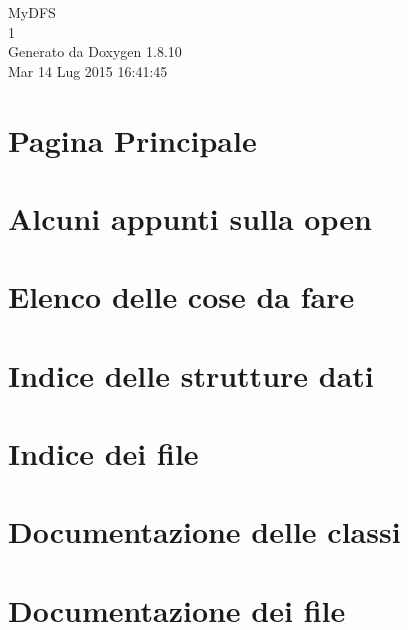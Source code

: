 \documentclass[twoside]{book}
\newcommand{\+}{\discretionary{\mbox{\scriptsize$\hookleftarrow$}}{}{}}
\newcommand{\clearemptydoublepage}{%
  \newpage{\pagestyle{empty}\cleardoublepage}%
}
\begin{document}
\hypersetup{pageanchor=false,
             bookmarks=true,
             bookmarksnumbered=true,
             pdfencoding=unicode
            }
\begin{titlepage}
\vspace*{7cm}
\begin{center}%
{\Large My\+D\+F\+S \\[1ex]\large 1 }\\
\vspace*{1cm}
{\large Generato da Doxygen 1.8.10}\\
\vspace*{0.5cm}
{\small Mar 14 Lug 2015 16:41:45}\\
\end{center}
\end{titlepage}
\clearemptydoublepage
\tableofcontents
\clearemptydoublepage
{}
\hypersetup{pageanchor=true}

\chapter{Pagina Principale}
\label{index}\hypertarget{index}{}
\chapter{Alcuni appunti sulla open}
\label{md_OPE}
\hypertarget{md_OPE}{}

\chapter{Elenco delle cose da fare}
\label{todo}
\hypertarget{todo}{}

\chapter{Indice delle strutture dati}

\chapter{Indice dei file}

\chapter{Documentazione delle classi}


\chapter{Documentazione dei file}































\backmatter
\newpage
{}
\clearemptydoublepage
{}
\printindex
\end{document}

